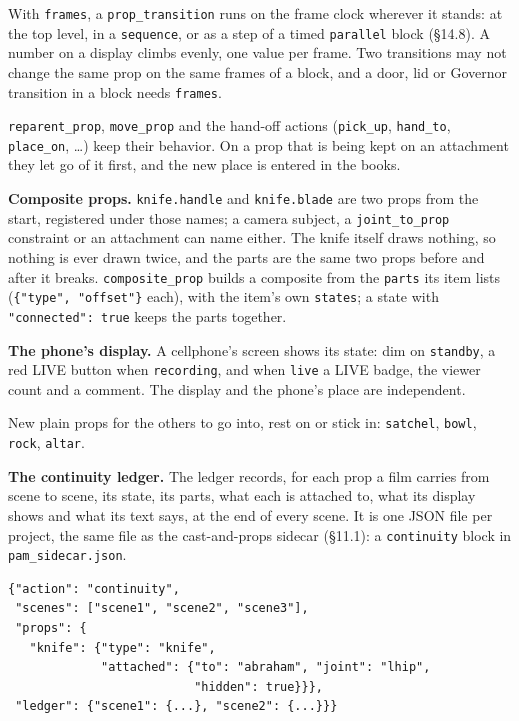 \documentclass[
  12pt,
  letterpaper,
]{book}
\begin{document}
With \texttt{frames}, a \texttt{prop\_transition} runs on the frame
clock wherever it stands: at the top level, in a \texttt{sequence}, or
as a step of a timed \texttt{parallel} block (\S14.8). A number on a
display climbs evenly, one value per frame. Two transitions may not
change the same prop on the same frames of a block, and a door, lid or
Governor transition in a block needs \texttt{frames}.

\texttt{reparent\_prop}, \texttt{move\_prop} and the hand-off actions
(\texttt{pick\_up}, \texttt{hand\_to}, \texttt{place\_on}, \ldots)
keep their behavior. On a prop that is being kept on an attachment they
let go of it first, and the new place is entered in the books.

\textbf{Composite props.} \texttt{knife.handle} and
\texttt{knife.blade} are two props from the start, registered under
those names; a camera subject, a \texttt{joint\_to\_prop} constraint
or an attachment can name either. The knife itself draws nothing, so
nothing is ever drawn twice, and the parts are the same two props
before and after it breaks. \texttt{composite\_prop} builds a
composite from the \texttt{parts} its item lists
(\texttt{\{"type",\ "offset"\}} each), with the item's own
\texttt{states}; a state with \texttt{"connected": true} keeps the
parts together.

\textbf{The phone's display.} A cellphone's screen shows its state: dim
on \texttt{standby}, a red LIVE button when \texttt{recording}, and
when \texttt{live} a LIVE badge, the viewer count and a comment. The
display and the phone's place are independent.

New plain props for the others to go into, rest on or stick in:
\texttt{satchel}, \texttt{bowl}, \texttt{rock}, \texttt{altar}.

\textbf{The continuity ledger.} The ledger records, for each prop a
film carries from scene to scene, its state, its parts, what each is
attached to, what its display shows and what its text says, at the end
of every scene. It is one JSON file per project,
the same file as the cast-and-props sidecar (\S11.1): a
\texttt{continuity} block in \texttt{pam\_sidecar.json}.

\begin{verbatim}
{"action": "continuity",
 "scenes": ["scene1", "scene2", "scene3"],
 "props": {
   "knife": {"type": "knife",
             "attached": {"to": "abraham", "joint": "lhip",
                          "hidden": true}}},
 "ledger": {"scene1": {...}, "scene2": {...}}}
\end{verbatim}
\end{document}
